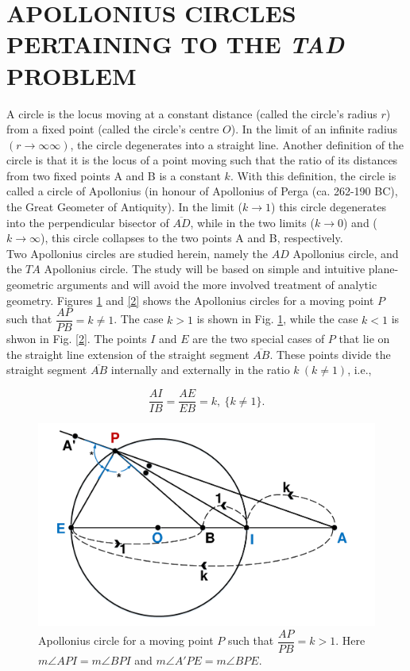 \documentclass[final,5p,times,twocolumn]{elsarticle}
\begin{document}

\section{APOLLONIUS CIRCLES PERTAINING TO THE \textit{TAD} PROBLEM}
A circle is the locus moving at a constant distance (called the circle's radius $r$) from a fixed point (called the circle's centre $O$).
In the limit of an infinite radius $(r\longrightarrow\infty∞)$, the circle degenerates into a straight line.
Another definition of the circle is that it is the locus of a point moving such that the ratio of its distances from two fixed points A and B is a constant $k$. With this definition, the circle is called a circle of Apollonius (in honour of Apollonius of Perga (ca. 262-190 BC), the Great Geometer of Antiquity). In the limit ($k\longrightarrow1$) this circle degenerates into the perpendicular bisector of $\overline{AD}$, while in the two limits ($k\longrightarrow0$) and ($k\longrightarrow\infty$), this circle collapses to the two points A and B, respectively. \\

Two Apollonius circles are studied herein, namely the $AD$ Apollonius circle, and the $TA$ Apollonius circle. The study will be based on simple and intuitive plane-geometric arguments and will avoid the more involved treatment of analytic geometry. Figures \ref{1} and \ref{2} shows the Apollonius circles for a moving point $P$ such that $\dfrac{AP}{PB}=k\neq1$. The case $k>1$ is shown in Fig. \ref{1}, while the case $k<1$ is shwon in Fig. \ref{2}. The points $I$ and $E$ are the two special cases of $P$ that lie on the straight line extension of the straight segment $\overline{AB}$. These points divide the straight segment $\overline{AB}$ internally and externally in the ratio $k\ (k\neq1)$, i.e., 

\begin{equation}
  \boxed{
  \dfrac{AI}{IB}=\dfrac{AE}{EB}=k,\ \{k\neq1\}.}
  \label{eqn:kratio}
\end{equation} 


\begin{figure}[htb]
\centering
\includegraphics[width=0.75\columnwidth]{drawing1.pdf}
\caption{Apollonius circle for a moving point $P$ such that $\dfrac{AP}{PB}=k>1$. Here $m\angle API = m\angle BPI$ and $m\angle A'PE = m\angle BPE$.}
\label{1}
\end{figure}
\end{document}
